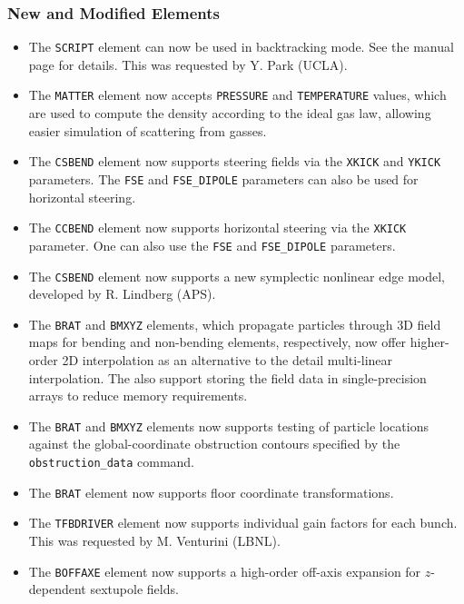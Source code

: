 \documentclass[11pt]{article}
\begin{document}
\subsubsection{New and Modified Elements}
\begin{itemize}
\item The \verb|SCRIPT| element can now be used in backtracking mode. See the manual page for details. This was requested
  by Y. Park (UCLA).
\item The \verb|MATTER| element now accepts \verb|PRESSURE| and \verb|TEMPERATURE| values, which are used to
  compute the density according to the ideal gas law, allowing easier simulation of scattering from gasses.
\item The \verb|CSBEND| element now supports steering fields via the \verb|XKICK| and \verb|YKICK| parameters.
  The \verb|FSE| and \verb|FSE_DIPOLE| parameters can also be used for horizontal steering.
\item The \verb|CCBEND| element now supports horizontal steering via the \verb|XKICK| parameter. One can also
  use the \verb|FSE| and \verb|FSE_DIPOLE| parameters.
\item The \verb|CSBEND| element now supports a new symplectic nonlinear edge model, developed by R. Lindberg (APS).
\item The \verb|BRAT| and \verb|BMXYZ| elements, which propagate particles through 3D field maps for
  bending and non-bending elements, respectively, now offer higher-order 2D interpolation as an alternative to the
  detail multi-linear interpolation. The also support storing the field data in single-precision arrays to reduce memory
  requirements.
\item The \verb|BRAT| and \verb|BMXYZ| elements now supports testing of particle locations against the global-coordinate obstruction
  contours specified by the \verb|obstruction_data| command.
\item The \verb|BRAT| element now supports floor coordinate transformations.
\item The \verb|TFBDRIVER| element now supports individual gain factors for each bunch. This was requested by
  M. Venturini (LBNL).
\item The \verb|BOFFAXE| element now supports a high-order off-axis expansion for $z$-dependent sextupole fields.
\end{itemize}
\end{document}
